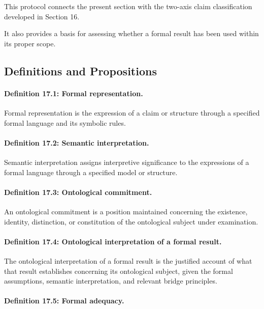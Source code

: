This protocol
connects the
present section
with the
two-axis claim
classification developed
in Section 16.

It also
provides a
basis for
assessing whether
a formal
result has
been used
within its
proper scope.

\subsection{Definitions and Propositions}

\paragraph{Definition 17.1: Formal representation.}

Formal representation
is the expression
of a claim
or structure
through a
specified formal
language and
its symbolic
rules.

\paragraph{Definition 17.2: Semantic interpretation.}

Semantic interpretation
assigns interpretive
significance to
the expressions
of a formal
language through
a specified
model or
structure.

\paragraph{Definition 17.3: Ontological commitment.}

An ontological
commitment is
a position
maintained concerning
the existence,
identity, distinction,
or constitution
of the
ontological subject
under examination.

\paragraph{Definition 17.4: Ontological interpretation of a formal result.}

The ontological
interpretation of
a formal
result is
the justified
account of
what that
result establishes
concerning its
ontological subject,
given the
formal assumptions,
semantic interpretation,
and relevant
bridge principles.

\paragraph{Definition 17.5: Formal adequacy.}

